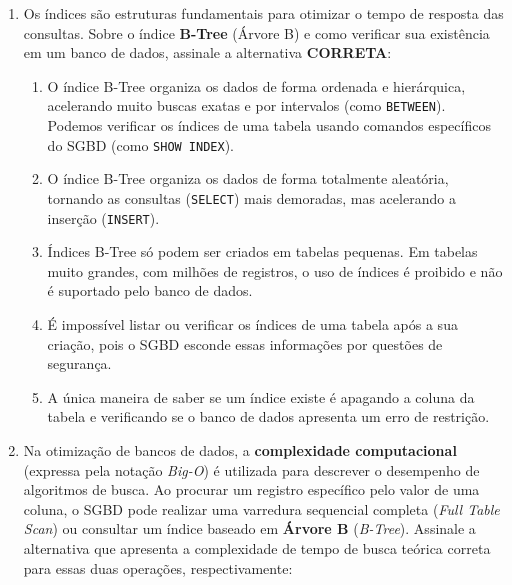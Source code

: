 \documentclass[12pt,a4paper]{article}
\begin{document}
\begin{enumerate}
    \vspace{0.5cm}

    \item  Os índices são estruturas fundamentais para otimizar o tempo de resposta das consultas. Sobre o índice \textbf{B-Tree} (Árvore B) e como verificar sua existência em um banco de dados, assinale a alternativa \textbf{CORRETA}:
    
    \begin{enumerate}[label=\alph*)]
        \item O índice B-Tree organiza os dados de forma ordenada e hierárquica, acelerando muito buscas exatas e por intervalos (como \texttt{BETWEEN}). Podemos verificar os índices de uma tabela usando comandos específicos do SGBD (como \texttt{SHOW INDEX}).
        \item O índice B-Tree organiza os dados de forma totalmente aleatória, tornando as consultas (\texttt{SELECT}) mais demoradas, mas acelerando a inserção (\texttt{INSERT}).
        \item Índices B-Tree só podem ser criados em tabelas pequenas. Em tabelas muito grandes, com milhões de registros, o uso de índices é proibido e não é suportado pelo banco de dados.
        \item É impossível listar ou verificar os índices de uma tabela após a sua criação, pois o SGBD esconde essas informações por questões de segurança.
        \item A única maneira de saber se um índice existe é apagando a coluna da tabela e verificando se o banco de dados apresenta um erro de restrição.
    \end{enumerate}

    \vspace{0.5cm}

    \item  Na otimização de bancos de dados, a \textbf{complexidade computacional} (expressa pela notação \textit{Big-O}) é utilizada para descrever o desempenho de algoritmos de busca. Ao procurar um registro específico pelo valor de uma coluna, o SGBD pode realizar uma varredura sequencial completa (\textit{Full Table Scan}) ou consultar um índice baseado em \textbf{Árvore B} (\textit{B-Tree}). Assinale a alternativa que apresenta a complexidade de tempo de busca teórica correta para essas duas operações, respectivamente:
    

\end{enumerate}
\end{document}
